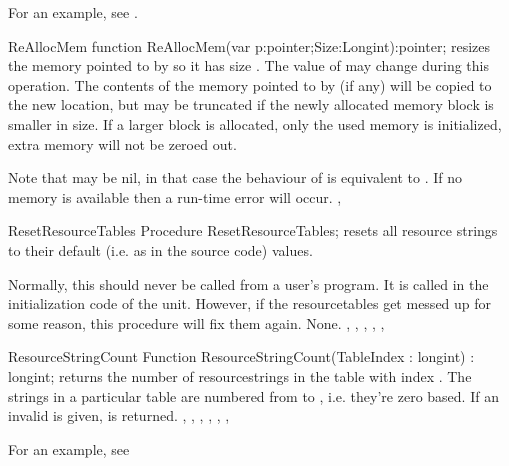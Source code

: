 For an example, see .

\begin{function}{ReAllocMem}
\Declaration
function ReAllocMem(var p:pointer;Size:Longint):pointer;
\Description
{} resizes the memory pointed to by  so it has size
. The value of  may change during this operation. 
The contents of the memory pointed to by  (if any) will be copied to 
the new location, but may be truncated if the newly allocated memory block
is smaller in size. If a larger block is allocated, only the used memory is
initialized, extra memory will not be zeroed out.

Note that  may be nil, in that case the behaviour of 
is equivalent to .
\Errors
If no memory is available then a run-time error will occur.
\SeeAlso
{}, 
\end{function}

\begin{procedure}{ResetResourceTables}
\Declaration
Procedure ResetResourceTables;
\Description
{} resets all resource strings to their default
(i.e. as in the source code) values.

Normally, this should never be called from a user's program. It is called
in the initialization code of the  unit. However, if the
resourcetables get messed up for some reason, this procedure will fix them
again.
\Errors
None.
\SeeAlso
{},
,
,
,
,
\end{procedure}

\begin{function}{ResourceStringCount}
\Declaration
Function ResourceStringCount(TableIndex : longint) : longint;
\Description
{} returns the number of resourcestrings in
the table with index . The strings in a particular table
are numbered from  to , i.e. they're zero
based.
\Errors
If an invalid  is given,  is returned.
\SeeAlso
{},
,
,
,
,
,
\end{function}

For an example, see 

